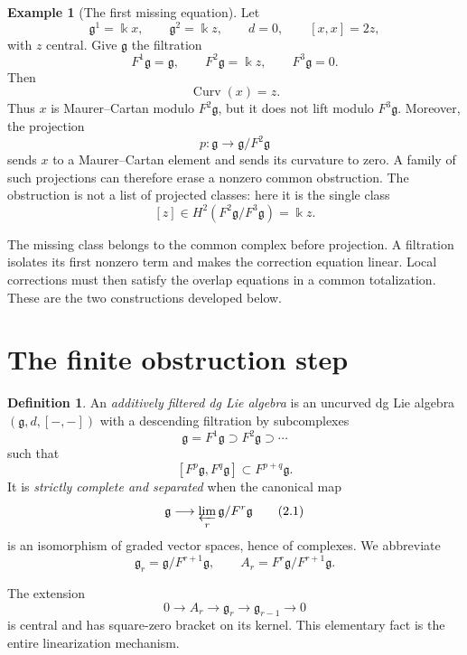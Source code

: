 \documentclass[11pt]{article}
\theoremstyle{definition}
\newtheorem{definition}[theorem]{Definition}
\newtheorem{example}[theorem]{Example}
\theoremstyle{remark}
\newcommand{\Curv}{\operatorname{Curv}}
\begin{document}
\begin{example}[The first missing equation]\label{ex:first}
Let
\[
 \mathfrak g^1=\Bbbk x,
 \qquad
 \mathfrak g^2=\Bbbk z,
 \qquad
 d=0,
 \qquad
 [x,x]=2z,
\]
with $z$ central.  Give $\mathfrak g$ the filtration
\[
 F^1\mathfrak g=\mathfrak g,
 \qquad
 F^2\mathfrak g=\Bbbk z,
 \qquad
 F^3\mathfrak g=0.
\]
Then
\[
 \Curv(x)=z.
\]
Thus $x$ is Maurer--Cartan modulo $F^2\mathfrak g$, but it does not lift
modulo $F^3\mathfrak g$.  Moreover, the projection
\[
 p:\mathfrak g\longrightarrow \mathfrak g/F^2\mathfrak g
\]
sends $x$ to a Maurer--Cartan element and sends its curvature to zero.  A
family of such projections can therefore erase a nonzero common obstruction.
The obstruction is not a list of projected classes: here it is the single
class
\[
 [z]\in H^2(F^2\mathfrak g/F^3\mathfrak g)=\Bbbk z.
\]
\end{example}

The missing class belongs to the common complex before projection.
A filtration isolates its first nonzero term and makes the correction
equation linear.  Local corrections must then satisfy the overlap equations
in a common totalization.  These are the two constructions developed below.

\section{The finite obstruction step}

\begin{definition}\label{def:filtered-dgla}
An \emph{additively filtered dg Lie algebra} is an uncurved dg Lie algebra
$(\mathfrak g,d,[-,-])$ with a descending filtration by subcomplexes
\[
 \mathfrak g=F^1\mathfrak g\supset F^2\mathfrak g\supset\cdots
\]
such that
\[
 [F^p\mathfrak g,F^q\mathfrak g]\subset F^{p+q}\mathfrak g.
\]
It is \emph{strictly complete and separated} when the canonical map
\[
 \mathfrak g\longrightarrow
 \varprojlim_r\mathfrak g/F^r\mathfrak g
 \tag{2.1}\label{eq:strict-completion}
\]
is an isomorphism of graded vector spaces, hence of complexes.
We abbreviate
\[
 \mathfrak g_r=\mathfrak g/F^{r+1}\mathfrak g,
 \qquad
 A_r=F^r\mathfrak g/F^{r+1}\mathfrak g.
\]
\end{definition}

The extension
\[
 0\longrightarrow A_r\longrightarrow \mathfrak g_r
 \longrightarrow \mathfrak g_{r-1}\longrightarrow0
 \tag{2.2}\label{eq:central-extension}
\]
is central and has square-zero bracket on its kernel.  This elementary fact is
the entire linearization mechanism.
\end{document}
